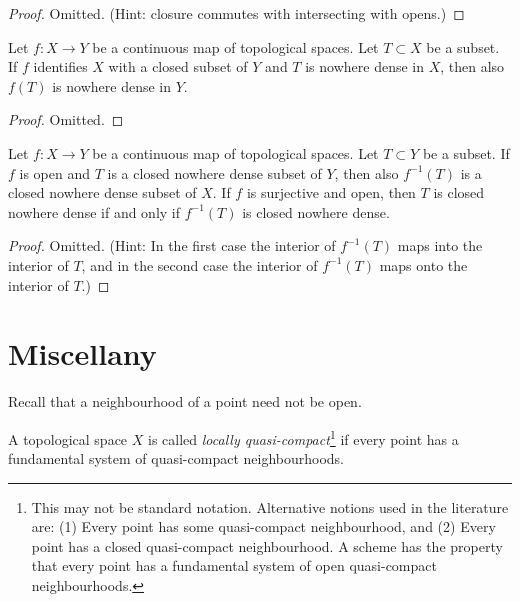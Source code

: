 \begin{proof}
Omitted. (Hint: closure commutes with intersecting with opens.)
\end{proof}

\begin{lemma}
\label{lemma-closed-image-nowhere-dense}
Let $f : X \to Y$ be a continuous map of topological spaces.
Let $T \subset X$ be a subset.
If $f$ identifies $X$ with a closed subset of $Y$
and $T$ is nowhere dense in $X$, then also $f(T)$ is nowhere dense in $Y$.
\end{lemma}

\begin{proof}
Omitted.
\end{proof}

\begin{lemma}
\label{lemma-open-inverse-image-closed-nowhere-dense}
Let $f : X \to Y$ be a continuous map of topological spaces.
Let $T \subset Y$ be a subset.
If $f$ is open and $T$ is a closed nowhere dense subset of $Y$,
then also $f^{-1}(T)$ is a closed nowhere dense subset of $X$.
If $f$ is surjective and open, then
$T$ is closed nowhere dense if and only
if $f^{-1}(T)$ is closed nowhere dense.
\end{lemma}

\begin{proof}
Omitted. (Hint: In the first case the interior of $f^{-1}(T)$
maps into the interior of $T$, and in the second case the interior of
$f^{-1}(T)$ maps onto the interior of $T$.)
\end{proof}




\section{Miscellany}
\label{section-miscellany}

\noindent
Recall that a neighbourhood of a point need not be open.

\begin{definition}
\label{definition-locally-quasi-compact}
A topological space $X$ is called
{\it locally quasi-compact}\footnote{This may not be standard notation.
Alternative notions used in the literature are: (1) Every point has some
quasi-compact neighbourhood, and (2) Every point has a closed quasi-compact
neighbourhood. A scheme has the property that every point has a fundamental
system of open quasi-compact neighbourhoods.} if every
point has a fundamental system of quasi-compact neighbourhoods.
\end{definition}

